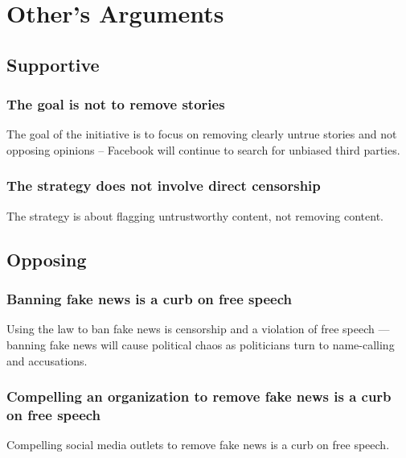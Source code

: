
\section{Other's Arguments}

\subsection{Supportive}


\subsubsection{The goal is not to remove stories}

The goal of the initiative is to focus on removing clearly untrue stories and not opposing opinions -- Facebook will continue to search for unbiased third parties. \cite{inc_fb_transparency}

\subsubsection{The strategy does not involve direct censorship}

The strategy is about flagging untrustworthy content, not removing content. \cite{inc_fb_transparency}


\subsection{Opposing}


\subsubsection{Banning fake news is a curb on free speech}

Using the law to ban fake news is censorship and a violation of free speech --- banning fake news will cause political chaos as politicians turn to name-calling and accusations. \cite{eff_cali_bill_distrastrous}

\subsubsection{Compelling an organization to remove fake news is a curb on free speech}

Compelling social media outlets to remove fake news is a curb on free speech. \cite{wp_germany_fake_news_law}


